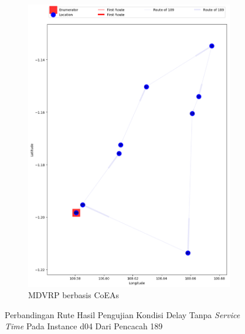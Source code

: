 \begin{figure}[H]
	\centering
	\begin{subfigure}[t]{\textwidth}
		\centering
		\includegraphics[width=\textwidth]{Resources/Images/delayed_4/real_m15_n100_delayed_4_189_coes}
		\caption{MDVRP berbasis CoEAs}
		\label{fig:real_m15_n100_delayed_4_189_coes}
	\end{subfigure}
	\caption{Perbandingan Rute Hasil Pengujian Kondisi Delay Tanpa \textit{Service Time} Pada Instance d04 Dari Pencacah 189}
	\label{fig:real_m15_n100_delayed_4_189}
\end{figure}


